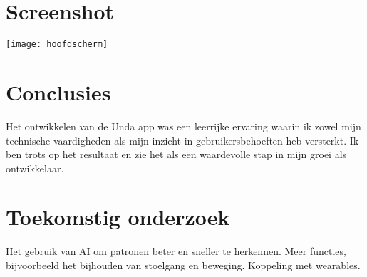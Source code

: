 \documentclass[a0,portrait]{hogent-poster}
\begin{document}
\begin{multicols}{2}
\section{Screenshot}

\begin{center}
  \captionsetup{type=figure}
  \texttt{[image: hoofdscherm]}
\end{center}


\section{Conclusies}

Het ontwikkelen van de Unda app was een leerrijke ervaring waarin ik zowel mijn technische vaardigheden 
als mijn inzicht in gebruikersbehoeften heb versterkt. Ik ben trots op het resultaat en zie het als een 
waardevolle stap in mijn groei als ontwikkelaar.
\section{Toekomstig onderzoek}
Het gebruik van AI om patronen beter en sneller te herkennen. 
Meer functies, bijvoorbeeld het bijhouden van stoelgang en beweging. 
Koppeling met wearables.

\end{multicols}
\end{document}
